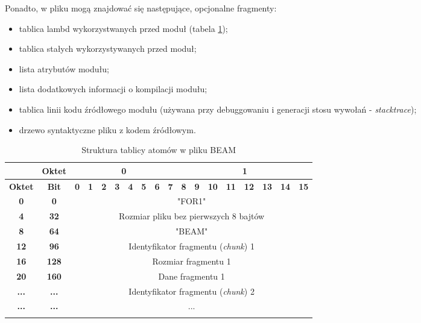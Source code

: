 Ponadto, w pliku mogą znajdować się następujące, opcjonalne fragmenty:
\begin{itemize}
\item tablica lambd wykorzystwanych przed moduł (tabela \ref{table:atomTable});
\item tablica stałych wykorzystywanych przed moduł;
\item lista atrybutów modułu;
\item lista dodatkowych informacji o kompilacji modułu;
\item tablica linii kodu źródłowego modułu (używana przy debuggowaniu i generacji stosu wywołań - \emph{stacktrace});
\item drzewo syntaktyczne pliku z kodem źródłowym.
\end{itemize}

\begin{longtable}{|c|c|c|c|c|c|c|c|c|c|c|c|c|c|c|c|c|c|}
\hline
         & \textbf{Oktet} & \multicolumn{8}{|c|}{\textbf{0}} & \multicolumn{8}{|c|}{\textbf{1}} \\
\hline
\textbf{Oktet} & \textbf{Bit} & \textbf{0} & \textbf{1} & \textbf{2} & \textbf{3} & \textbf{4} & \textbf{5} & \textbf{6} & \textbf{7} & \textbf{8} & \textbf{9} & \textbf{10} & \textbf{11} & \textbf{12} & \textbf{13} & \textbf{14} & \textbf{15}\\
\hline
\textbf{0} & \textbf{0} & \multicolumn{16}{|c|}{"FOR1"} \\[2ex]
\hline
\textbf{4} & \textbf{32} & \multicolumn{16}{|c|}{Rozmiar pliku bez pierwszych 8 bajtów}\\[2ex]
\hline
\textbf{8} & \textbf{64} & \multicolumn{16}{|c|}{"BEAM"} \\[2ex]
\hline
\textbf{12} & \textbf{96} & \multicolumn{16}{|c|}{Identyfikator fragmentu (\emph{chunk}) 1}\\[2ex]
\hline
\textbf{16} & \textbf{128} & \multicolumn{16}{|c|}{Rozmiar fragmentu 1} \\[2ex]
\hline
\textbf{20} & \textbf{160} & \multicolumn{16}{|c|}{Dane fragmentu 1} \\[10ex]
\hline
\textbf{...} & \textbf{...} & \multicolumn{16}{|c|}{Identyfikator fragmentu (\emph{chunk}) 2}\\[2ex]
\hline
\textbf{...} & \textbf{...} & \multicolumn{16}{|c|}{...} \\
\hline
\caption{Struktura tablicy atomów w pliku BEAM}
\label{table:atomTable} \\
\end{longtable}

